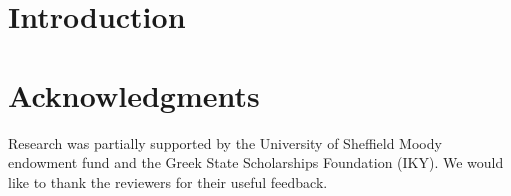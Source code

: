 \documentclass{article}
\begin{document}
\section{Introduction}









\section*{Acknowledgments}
Research was partially supported by the University of Sheffield Moody endowment fund and the Greek State Scholarships Foundation (IKY).
We would like to thank the reviewers for their useful feedback.



\small



%
\end{document}
